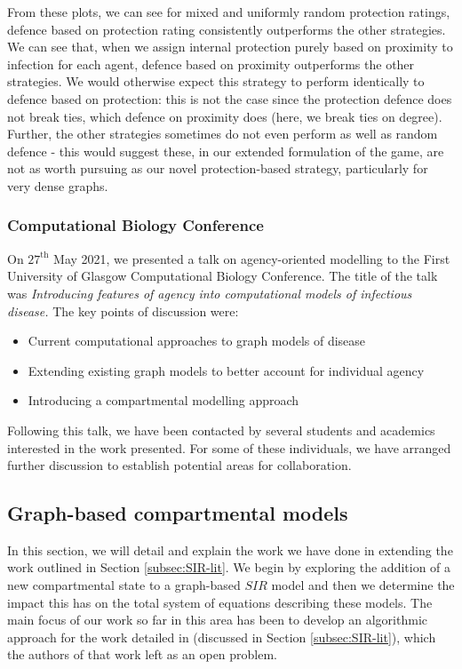 \documentclass[../report.tex]{subfiles}
\begin{document}
From these plots, we can see for mixed and uniformly random protection ratings, defence based on protection rating consistently outperforms the other strategies. We can see that, when we assign internal protection purely based on proximity to infection for each agent, defence based on proximity outperforms the other strategies. We would otherwise expect this strategy to perform identically to defence based on protection: this is not the case since the protection defence does not break ties, which defence on proximity does (here, we break ties on degree). Further, the other strategies sometimes do not even perform as well as random defence - this would suggest these, in our extended formulation of the game, are not as worth pursuing as our novel protection-based strategy, particularly for very dense graphs.

\subsubsection{Computational Biology Conference}

On $27^{\text{th}}$ May 2021, we presented a talk on agency-oriented modelling to the First University of Glasgow Computational Biology Conference. The title of the talk was {\it Introducing features of agency into computational models of infectious disease.}
The key points of discussion were:
\begin{itemize}
\item Current computational approaches to graph models of disease
\item Extending existing graph models to better account for individual agency
\item Introducing a compartmental modelling approach
\end{itemize} 

Following this talk, we have been contacted by several students and academics interested in the work presented. For some of these individuals, we have arranged further discussion to establish potential areas for collaboration.


\subsection{Graph-based compartmental models}

In this section, we will detail and explain the work we have done in extending the work outlined in Section \ref{subsec:SIR-lit}. We begin by exploring the addition of a new compartmental state to a graph-based $SIR$ model and then we determine the impact this has on the total system of equations describing these models. The main focus of our work so far in this area has been to develop an algorithmic approach for the work detailed in \cite{kiss_2014} (discussed in Section \ref{subsec:SIR-lit}), which the authors of that work left as an open problem.
\end{document}

